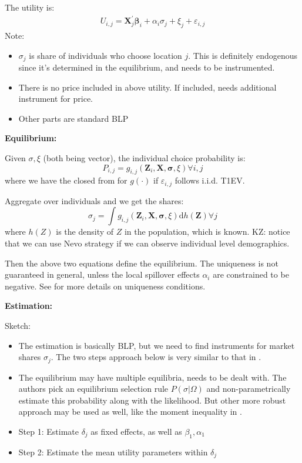The utility is:
\begin{align}
    U_{i, j}=\mathbf{X}_{j}^{\prime} \boldsymbol{\beta}_{i}+\alpha_{i} \sigma_{j}+\xi_{j}+\varepsilon_{i, j}
\end{align}
Note:
\begin{itemize}
    \item $\sigma_j$ is share of individuals who choose location $j$. This is definitely endogenous since it's determined in the equilibrium, and needs to be instrumented.
    \item There is no price included in above utility. If included, needs additional instrument for price.
    \item Other parts are standard BLP
\end{itemize}

\textbf{Equilibrium:}

Given $\sigma,\xi$ (both being vector), the individual choice probability is:
\[
    P_{i, j}=g_{i, j}\left(\mathbf{Z}_{i}, \mathbf{X}, \boldsymbol{\sigma}, \xi\right) \forall i, j
\]
where we have the closed from for $g(\cdot)$ if $\varepsilon_{i,j}$ follows i.i.d. T1EV.

Aggregate over individuals and we get the shares:
\[
    \sigma_{j}=\int g_{i, j}\left(\mathbf{Z}_{i}, \mathbf{X}, \boldsymbol{\sigma}, \xi\right) \mathrm{d} h(\boldsymbol{Z}) \forall j
\]
where $h(Z)$ is the density of $Z$ in the population, which is known. 
KZ: notice that we can use Nevo strategy if we can observe individual level demographics.

Then the above two equations define the equilibrium. 
The uniqueness is not guaranteed in general, unless the local spillover effects $\alpha_i$ are constrained to be negative.
See \textcite{BayerMcMillan2010} for more details on uniqueness conditions.

\textbf{Estimation:}

Sketch:
\begin{itemize}
    \item The estimation is basically BLP, but we need to find instruments for market shares $\sigma_j$. The two steps approach below is very similar to that in \citet{Hackmann2019}.
    \item The equilibrium may have multiple equilibria, needs to be dealt with. The authors pick an equilibrium selection rule $P(\sigma | \Omega)$ and non-parametrically estimate this probability along with the likelihood. But other more robust approach may be used as well, like the moment inequality in \citet{CilibertoTamer2009}.
    \item Step 1: Estimate $\delta_j$ as fixed effects, as well as $\beta_1, \alpha_1$
    \item Step 2: Estimate the mean utility parameters within $\delta_j$
\end{itemize}

